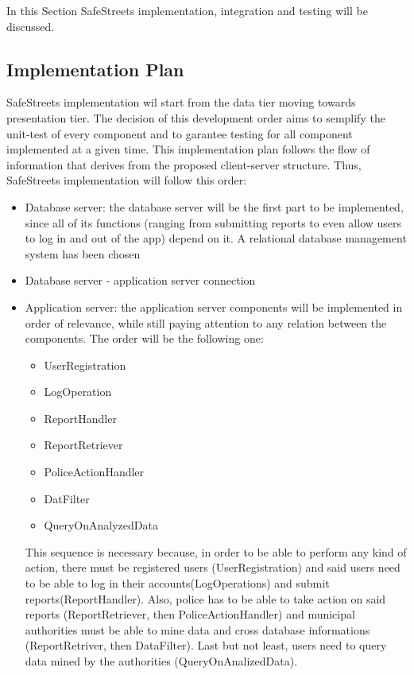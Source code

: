In this Section SafeStreets implementation, integration and testing will be discussed.
\\

\subsection{Implementation Plan}
SafeStreets implementation wil start from the data tier moving towards presentation tier. The decision of this development order aims to semplify  the unit-test of every component and to garantee testing for all component implemented at a given time. This implementation plan follows the flow of information that derives from the proposed client-server structure.\newline
Thus, SafeStreets implementation will follow this order:
\begin{itemize}
	\item Database server: the database server will be the first part to be implemented, since all of its functions (ranging from submitting reports to even allow users to log in and out of the app) depend on it. A relational database management system has been chosen
	\item Database server - application server connection
	\item Application server: the application server components will be implemented in order of relevance, while still paying attention to any relation between the components. The order will be the following one:
	\begin{itemize}
		\item UserRegistration
		\item LogOperation
		\item ReportHandler
		\item ReportRetriever
		\item PoliceActionHandler
		\item DatFilter
		\item QueryOnAnalyzedData
	\end{itemize}
	This sequence is necessary because, in order to be able to perform any kind of action, there must be registered users (UserRegistration) and said users need to be able to log in their accounts(LogOperations) and submit reports(ReportHandler). Also, police has to be able to take action on said reports (ReportRetriever, then PoliceActionHandler)  and municipal authorities must be able to mine data and cross database informations (ReportRetriver, then DataFilter). Last but not least, users need to query data mined by the authorities (QueryOnAnalizedData).

\end{itemize}

